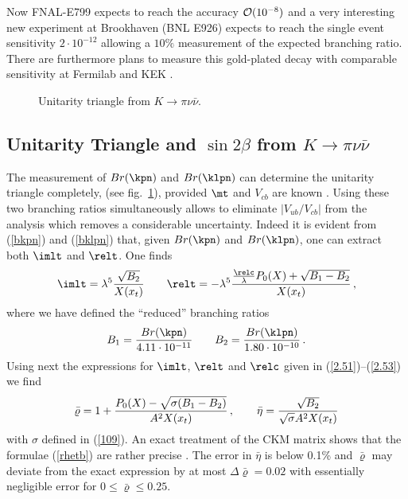 Now FNAL-E799 expects to reach
the accuracy ${\cal O}(10^{-8})$ and
a very interesting new experiment
at Brookhaven (BNL E926) \cite{AGS2} 
expects to reach the single event sensitivity $2\cdot 10^{-12}$
allowing a $10\%$ measurement of the expected branching ratio. 
There are furthermore plans
to measure this gold-plated  decay with comparable sensitivity
at Fermilab \cite{FNALKL} and KEK \cite{KEKKL}.
\begin{figure}[hbt]
\vspace{0.10in}
\centerline{
\epsfysize=2.7in
}
\vspace{0.08in}
\caption{Unitarity triangle from $K\to\pi\nu\bar\nu$.}\label{fig:KPKL}
\end{figure}

\subsection{Unitarity Triangle and $\sin 2\beta$ from $K\to\pi\nu\bar\nu$}
\label{sec:Kpnn:Triangle}
The measurement of $Br(\kpn)$ and $Br(\klpn)$ can determine the
unitarity triangle completely, (see fig.~\ref{fig:KPKL}), 
provided $\mt$ and $V_{cb}$ are known \cite{BH}.
Using these two branching ratios simultaneously allows to eliminate
$|V_{ub}/V_{cb}|$ from the analysis which removes a considerable
uncertainty. Indeed it is evident from (\ref{bkpn}) and
(\ref{bklpn}) that, given $Br(\kpn)$ and $Br(\klpn)$, one can extract
both $\imlt$ and $\relt$. One finds \cite{BB4,BBL}
\begin{equation}\label{imre}
\imlt=\lambda^5{\sqrt{B_2}\over X(x_t)}\qquad
\relt=-\lambda^5{{\relc\over\lambda}P_0(X)+\sqrt{B_1-B_2}\over X(x_t)}\,,
\end{equation}
where we have defined the ``reduced'' branching ratios
\begin{equation}\label{b1b2}
B_1={Br(\kpn)\over 4.11\cdot 10^{-11}}\qquad
B_2={Br(\klpn)\over 1.80\cdot 10^{-10}}\,.
\end{equation}
Using next the expressions for $\imlt$, $\relt$ and $\relc$ given
in (\ref{2.51})--(\ref{2.53}) we find
\begin{equation}\label{rhetb}
\bar\varrho=1+{P_0(X)-\sqrt{\sigma(B_1-B_2)}\over A^2 X(x_t)}\,,\qquad
\bar\eta={\sqrt{B_2}\over\sqrt{\sigma} A^2 X(x_t)}
\end{equation}
with $\sigma$ defined in (\ref{109}). An exact treatment of the CKM
matrix shows that the formulae (\ref{rhetb}) are rather precise
\cite{BB4}. The error in $\bar\eta$ is below 0.1\% and
$\bar\varrho$ may deviate from the exact expression by at most
$\Delta\bar\varrho=0.02$ with essentially negligible error for
$0\leq\bar\varrho\leq 0.25$.

